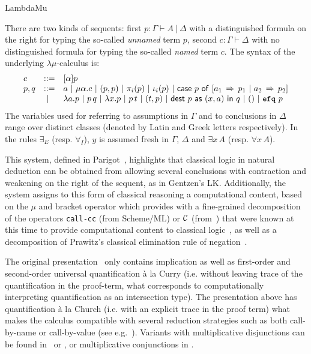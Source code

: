 \begin{entry}{LambdaMu}
\begin{clarifications}
There are two kinds of sequents: first $p: \Gamma \vdash A ~|~
\Delta$ with a distinguished formula on the right for typing the
so-called {\em unnamed} term $p$, second $c : \Gamma \vdash \Delta$ with no
distinguished formula for typing the so-called {\em named} term $c$.
The syntax of the underlying $\lambda\mu$-calculus 
is:
$$
\begin{array}{lll}
c & ::= & [\alpha]p\\
p,q  & ::= & a ~|~ \mu\alpha.c ~|~ (p,p) ~|~ \pi_i(p) ~|~ \iota_i(p) ~|~ \mathsf{case}~p~\mathsf{of}~[a_1\,\Rightarrow\,p_1~|~a_2\,\Rightarrow\,p_2] \\
& ~|~ & \lambda a.p ~|~ p\,q 
~|~ \lambda x.p ~|~ p\,t 
~|~ (t,p) ~|~ \mathsf{dest}~p~\mathsf{as}~(x,a)~\mathsf{in}~q
 ~|~ () ~|~ \texttt{efq}~{p}\\
\end{array}
$$ The variables used for referring to assumptions in $\Gamma$ and to
conclusions in $\Delta$ range over distinct classes (denoted by Latin
and Greek letters respectively). In the rules
$\exists_E$ (resp. $\forall_I$), $y$ is assumed fresh in $\Gamma$,
$\Delta$ and $\exists x\, A$ (resp. $\forall x\, A$).
\end{clarifications}

\begin{history}
This system, defined in Parigot~\cite{Parigot92},
highlights that classical logic in natural deduction can be obtained
from allowing several conclusions with contraction and weakening on
the right of the sequent, as in Gentzen's LK.  Additionally, the
system assigns to this form of classical reasoning a computational
content, based on the $\mu$ and bracket operator which provides with a
fine-grained decomposition
of the operators {\tt call-cc} (from Scheme/ML) or ${\cal C}$
(from~\cite{FelFriKohDub86}) that were known at this time to provide
computational content to classical logic~\cite{Griffin90}, as well as
a decomposition of Prawitz's classical elimination rule of
negation~\cite{Prawitz65}.

The original presentation~\cite{Parigot92} only contains implication
as well as first-order and second-order universal quantification \`a
la Curry (i.e. without leaving trace of the quantification in the
proof-term, what corresponds to computationally interpreting
quantification as an intersection type). The presentation above has
quantification \`a la Church (i.e. with an explicit trace in the proof
term) what makes the calculus compatible with several reduction
strategies such as both call-by-name or call-by-value (see
e.g.~\cite{HerbelinHdR}). Variants with multiplicative disjunctions
can be found in~\cite{Selinger01} or \cite{PymRitter01}, or
multiplicative conjunctions in \cite{HerbelinHdR}.


\end{history}
\end{entry}
